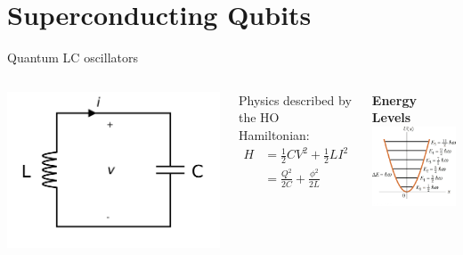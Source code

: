 \section{Superconducting Qubits}

\begin{frame}{Quantum LC oscillators}
\begin{columns}
  \includegraphics[width=\textwidth]{images/lc_circuit.png}

  Physics described by the HO Hamiltonian:
  \begin{equation*}
    \begin{aligned}
    H &= \frac{1}{2} C V^2 + \frac{1}{2} L I^2 \\
      &= \frac{Q^2}{2C} + \frac{\phi^2}{2L}
    \end{aligned}
  \end{equation*}

  \textbf{Energy Levels}
  \includegraphics[width=\textwidth]{images/harm_osc_energies.png}


\end{columns}
\end{frame}
